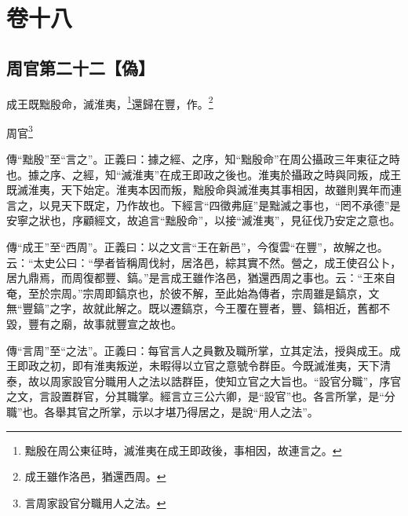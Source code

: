 

\chapter{卷十八}


\section{周官第二十二【偽】}


成王既黜殷命，滅淮夷，\footnote{黜殷在周公東征時，滅淮夷在成王即政後，事相因，故連言之。}還歸在豐，作。\footnote{成王雖作洛邑，猶還西周。}

周官\footnote{言周家設官分職用人之法。}


{\noindent\zhuan{}\fzbyks 傳“黜殷”至“言之”。正義曰：據之經、之序，知“黜殷命”在周公攝政三年東征之時也。據之序、之經，知“滅淮夷”在成王即政之後也。淮夷於攝政之時與同叛，成王既滅淮夷，天下始定。淮夷本因而叛，黜殷命與滅淮夷其事相因，故雖則異年而連言之，以見天下既定，乃作故也。下經言“四徵弗庭”是黜滅之事也，“罔不承德”是安寧之狀也，序顧經文，故追言“黜殷命”，以接“滅淮夷”，見征伐乃安定之意也。 \par}

{\noindent\zhuan{}\fzbyks 傳“成王”至“西周”。正義曰：以之文言“王在新邑”，今復雲“在豐”，故解之也。云：“太史公曰：“學者皆稱周伐紂，居洛邑，綜其實不然。營之，成王使召公卜，居九鼎焉，而周復都豐、鎬。”是言成王雖作洛邑，猶還西周之事也。云：“王來自奄，至於宗周。”宗周即鎬京也，於彼不解，至此始為傳者，宗周雖是鎬京，文無“豐鎬”之字，故就此解之。既以遷鎬京，今王覆在豐者，豐、鎬相近，舊都不毀，豐有之廟，故事就豐宣之故也。 \par}

{\noindent\zhuan{}\fzbyks 傳“言周”至“之法”。正義曰：每官言人之員數及職所掌，立其定法，授與成王。成王即政之初，即有淮夷叛逆，未暇得以立官之意號令群臣。今既滅淮夷，天下清泰，故以周家設官分職用人之法以誥群臣，使知立官之大旨也。“設官分職”，序官之文，言設置群官，分其職掌。經言立三公六卿，是“設官”也。各言所掌，是“分職”也。各舉其官之所掌，示以才堪乃得居之，是說“用人之法”。 \par}

